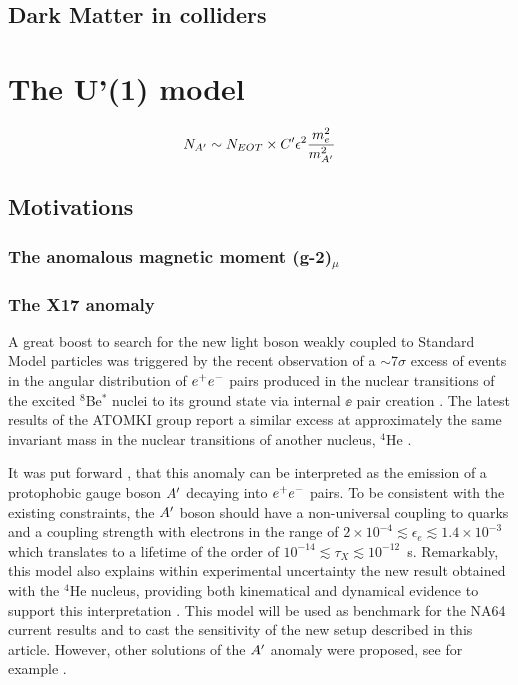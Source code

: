 \subsection{Dark Matter in colliders}
\label{ch1:sec:dm-colliders}

\section{The U'(1) model}
\label{ch1:sec:dm-u1model}

\begin{equation}
  \label{eq:dm-rate}
  N_{A'} \sim N_{EOT} \times C' \epsilon^2 \frac{m_e^2}{m^2_{A'}}
\end{equation}

\subsection{Motivations}
\label{ch1:sec:dm-u1model-motivations}

\subsubsection{The anomalous magnetic moment (g-2)$_{\mu}$}
\label{ch1:sec:dm-u1model-motivations-g2}

\subsubsection{The X17 anomaly}
\label{ch1:sec:dm-u1model-motivations-x17}

A great boost to search for the new light boson weakly coupled to Standard Model particles was triggered by the recent observation of a $\sim$7$\sigma$ excess of events in the angular distribution of $e^+e^-$ pairs produced in the nuclear transitions of the excited $^8$Be$^*$ nuclei to its ground state via internal $\ee$ pair creation \cite{Krasznahorkay:2015iga}. The latest results of the ATOMKI group report a similar excess at approximately the same invariant mass in the nuclear transitions of another nucleus, $^4$He \cite{Krasznahorkay:2019lyl}.

It was put forward  \cite{Feng:2016jff,PhysRevD.95.035017}, that this anomaly can be interpreted as the emission of a protophobic gauge boson $A'$ decaying into $e^+e^-$ pairs. To be consistent with the existing constraints, the $A'$ boson should have a non-universal coupling to quarks and a coupling strength with electrons in the range of $2\times 10^{-4} \lesssim \epsilon_e \lesssim 1.4\times 10^{-3}$ which translates to a lifetime of the order of $10^{-14}\lesssim \tau_X \lesssim 10^{-12}$~s. Remarkably, this model also explains within experimental uncertainty the new result obtained with the $^4$He nucleus, providing both kinematical and dynamical evidence to support this interpretation \cite{Feng:2020mbt}. This model will be used as benchmark for the NA64 current results and to cast the sensitivity of the new setup described in this article. However, other solutions of the $A'$ anomaly were proposed, see for example \cite{Nam:2019osu, Seto:2016pks}.

